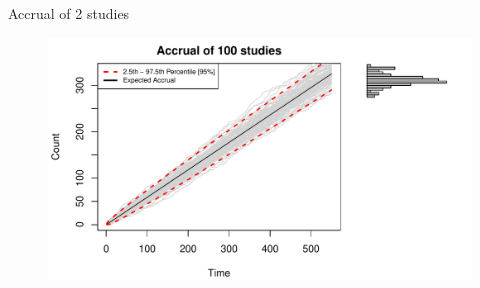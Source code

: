 \documentclass[english]{beamer}\usepackage[]{graphicx}\usepackage[]{xcolor}
\makeatletter
\def\maxwidth{ %
  \ifdim\Gin@nat@width>\linewidth
    \linewidth
  \else
    \Gin@nat@width
  \fi
}
\newenvironment{knitrout}{}{} %
\makeatother
\begin{document}
\begin{frame}{Accrual of 2 studies}

\begin{figure}

\begin{knitrout}
\color{fgcolor}
\includegraphics[width=\maxwidth]{figures/figunnamed-chunk-4-1} 
\end{knitrout}
  
\end{figure}


\end{frame}
\end{document}
